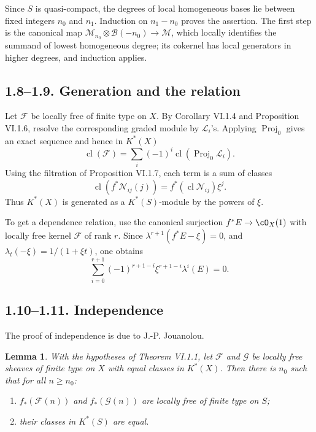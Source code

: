 \documentclass[11pt]{article}
\theoremstyle{plain}
\newtheorem{lemma}[theorem]{Lemma}
\theoremstyle{definition}
\theoremstyle{remark}
\DeclareMathOperator{\Proj}{Proj}
\DeclareMathOperator{\cl}{cl}
\begin{document}
Since $S$ is quasi-compact, the degrees of local homogeneous bases lie between fixed integers $n_0$ and $n_1$. Induction on $n_1-n_0$ proves the assertion. The first step is the canonical map $\mathcal M_{n_0}\otimes\mathcal B(-n_0)\to\mathcal M$, which locally identifies the summand of lowest homogeneous degree; its cokernel has local generators in higher degrees, and induction applies.

\subsection*{1.8--1.9. Generation and the relation}
Let $\mathcal F$ be locally free of finite type on $X$. By Corollary VI.1.4 and Proposition VI.1.6, resolve the corresponding graded module by $\mathcal L_i$'s. Applying $\Proj_0$ gives an exact sequence and hence in $K^*(X)$
\[
\cl(\mathcal F)=\sum_i(-1)^i\cl(\Proj_0\mathcal L_i).
\]
Using the filtration of Proposition VI.1.7, each term is a sum of classes
\[
\cl(f^*\mathcal N_{ij}(j))=f^*(\cl\mathcal N_{ij})\xi^j.
\]
Thus $K^*(X)$ is generated as a $K^*(S)$-module by the powers of $\xi$.

To get a dependence relation, use the canonical surjection $f^*E\to\cO_X(1)$ with locally free kernel $\mathcal F$ of rank $r$. Since $\lambda^{r+1}(f^*E-\xi)=0$, and $\lambda_t(-\xi)=1/(1+\xi t)$, one obtains
\begin{equation}\label{eq:VI.1.9.1}
\sum_{i=0}^{r+1}(-1)^{r+1-i}\xi^{r+1-i}\lambda^i(E)=0.
\end{equation}

\subsection*{1.10--1.11. Independence}
The proof of independence is due to J.-P. Jouanolou.

\begin{lemma}\label{lem:VI.1.10}
With the hypotheses of Theorem VI.1.1, let $\mathcal F$ and $\mathcal G$ be locally free sheaves of finite type on $X$ with equal classes in $K^*(X)$. Then there is $n_0$ such that for all $n\geq n_0$:
\begin{enumerate}[label=(\roman*)]
\item $f_*(\mathcal F(n))$ and $f_*(\mathcal G(n))$ are locally free of finite type on $S$;
\item their classes in $K^*(S)$ are equal.
\end{enumerate}
\end{lemma}
\end{document}
